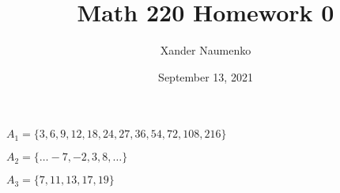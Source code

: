 \documentclass[letterpaper, reqno,11pt]{article}
\begin{document}
\title{Math 220 Homework 0}
\date{September 13, 2021}
\author{Xander Naumenko}
\newtheorem{thm}{Theorem}
\maketitle


 $A_1=\{3, 6, 9, 12, 18, 24, 27, 36, 54, 72, 108, 216\}$

 $A_2=\{\ldots -7, -2, 3, 8, \ldots\}$

 $A_3=\{7, 11, 13, 17, 19\}$
\end{document}
